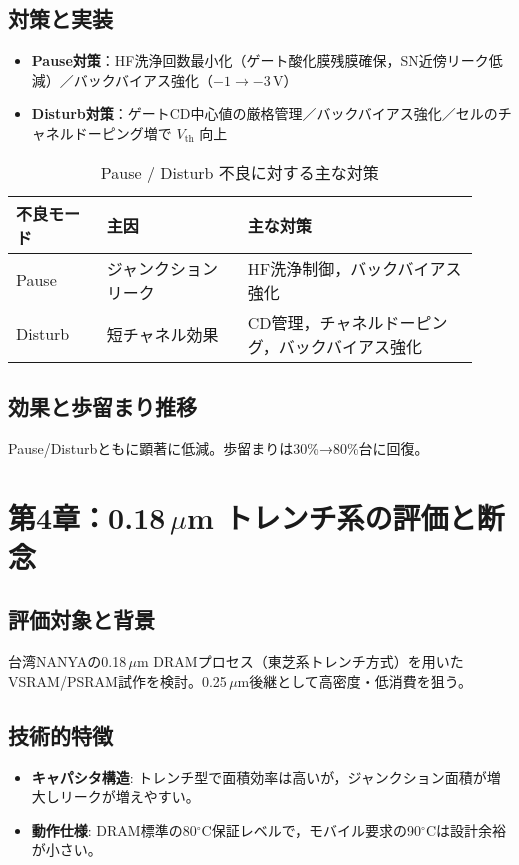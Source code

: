 \documentclass[conference]{IEEEtran}
\begin{document}
\subsection{対策と実装}
\begin{itemize}
  \item \textbf{Pause対策}：HF洗浄回数最小化（ゲート酸化膜残膜確保，SN近傍リーク低減）／バックバイアス強化（$-1\to-3$\,V）
  \item \textbf{Disturb対策}：ゲートCD中心値の厳格管理／バックバイアス強化／セルのチャネルドーピング増で $V_\mathrm{th}$ 向上
\end{itemize}

\begin{table}[t]
\centering
\caption{Pause / Disturb 不良に対する主な対策}
\begin{tabular}{p{0.18\linewidth} p{0.28\linewidth} p{0.46\linewidth}}
\toprule
不良モード & 主因 & 主な対策 \\
\midrule
Pause   & ジャンクションリーク & HF洗浄制御，バックバイアス強化 \\
Disturb & 短チャネル効果       & CD管理，チャネルドーピング，バックバイアス強化 \\
\bottomrule
\end{tabular}
\end{table}

\subsection{効果と歩留まり推移}
Pause/Disturbともに顕著に低減。歩留まりは30\%→80\%台に回復。

\section{第4章：0.18\,\texorpdfstring{$\mu$m}{μm} トレンチ系の評価と断念}

\subsection{評価対象と背景}
台湾NANYAの0.18\,$\mu$m DRAMプロセス（東芝系トレンチ方式）を用いたVSRAM/PSRAM試作を検討。0.25\,$\mu$m後継として高密度・低消費を狙う。

\subsection{技術的特徴}
\begin{itemize}
  \item \textbf{キャパシタ構造}: トレンチ型で面積効率は高いが，ジャンクション面積が増大しリークが増えやすい。
  \item \textbf{動作仕様}: DRAM標準の80$^\circ$C保証レベルで，モバイル要求の90$^\circ$Cは設計余裕が小さい。
\end{itemize}
\end{document}
